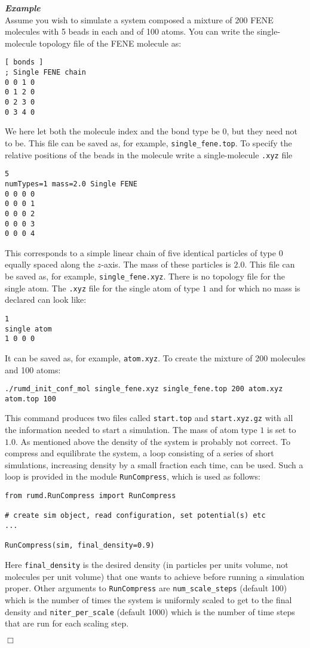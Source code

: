 \documentclass[a4paper]{article}
\newenvironment{example}%
{\bigskip \textbf{\textit{Example}}\\}%
{$\Box$ \newline}
\begin{document}
\begin{example}
Assume you wish to simulate a system composed a mixture of 200 FENE molecules
with 5 beads in each and of 100 atoms. You can write the single-molecule topology file 
of the FENE molecule as:

\begin{verbatim}
[ bonds ]
; Single FENE chain
0 0 1 0
0 1 2 0
0 2 3 0
0 3 4 0
\end{verbatim}
We here let both the molecule index and the bond type be 0, but they need not to be. This file can be saved as, for example, \verb|single_fene.top|. To specify the relative positions of the beads in the molecule
write a single-molecule \verb|.xyz| file
\begin{verbatim}
5
numTypes=1 mass=2.0 Single FENE
0 0 0 0
0 0 0 1
0 0 0 2
0 0 0 3
0 0 0 4
\end{verbatim}
This corresponds to a simple linear chain of five identical particles of type 0 equally spaced along the $z$-axis.
The mass of these particles is $2.0$.
This file can be saved as, for example, \verb|single_fene.xyz|.
There is no topology file for the single atom. The \verb|.xyz| file for the single atom of type $1$
and for which no mass is declared can look like:
\begin{verbatim}
1
single atom
1 0 0 0
\end{verbatim}
It can be saved as, for example, \verb|atom.xyz|.
To create the mixture of 200 molecules and 100 atoms:
\begin{verbatim}
./rumd_init_conf_mol single_fene.xyz single_fene.top 200 atom.xyz atom.top 100
\end{verbatim}
This command produces two files called \verb|start.top| and
\verb|start.xyz.gz| with all the information needed to start a
simulation. The mass of atom type $1$ is set to $1.0$. As mentioned above the density of the system is
probably not correct. To compress and equilibrate the system, a loop consisting
of a series of short simulations, increasing density by a small fraction each time, can be used. Such a loop is provided in the module \verb|RunCompress|, which is used as follows:

\begin{verbatim}
from rumd.RunCompress import RunCompress

# create sim object, read configuration, set potential(s) etc
... 

RunCompress(sim, final_density=0.9)
\end{verbatim}

Here \verb|final_density| is the desired density (in particles per units volume, not molecules per unit volume) that one wants to achieve before running a simulation proper. Other arguments to \verb|RunCompress| are \verb|num_scale_steps| (default 100) which is the number of times the system is uniformly scaled to get to the final density and \verb|niter_per_scale| (default 1000) which is the number of time steps that are run for each scaling step.

\end{example}
\end{document}
